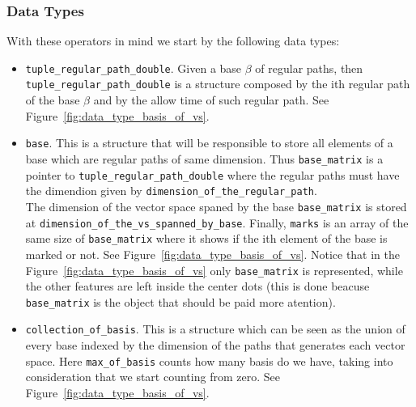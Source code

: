 \documentclass[11pt,a4paper]{article}
\begin{document}
\subsubsection{Data Types}
With these operators in mind we start by the following data types:
\begin{itemize}
	\item \texttt{tuple\_regular\_path\_double}. Given a base $\beta$ of regular paths, then
		\texttt{tuple\_regular\_path\_double} is a structure composed
		by the ith regular path of the base $\beta$ and by the 
		allow time of such regular path.
		See Figure~\ref{fig:data_type_basis_of_vs}.

	\item \texttt{base}. This is a structure that will be responsible to store all
		elements of a base which are regular paths of same
		dimension. Thus \texttt{base\_matrix} is a pointer to 
		\texttt{tuple\_regular\_path\_double} where the regular paths must 
		have the dimendion given by \texttt{dimension\_of\_the\_regular\_path}.\\
		The dimension of the vector space spaned by the base \texttt{base\_matrix}
		is stored at \texttt{dimension\_of\_the\_vs\_spanned\_by\_base}.
		Finally, \texttt{marks} is an array of
		the same size of \texttt{base\_matrix} where it shows if the ith element
		of the base is marked or not.
		See Figure~\ref{fig:data_type_basis_of_vs}. Notice that in the 
		Figure~\ref{fig:data_type_basis_of_vs}	only \texttt{base\_matrix} is
		represented, while the other features are left inside the center
		dots (this is done beacuse \texttt{base\_matrix} is the 
		object that should be paid more atention).

	\item \texttt{collection\_of\_basis}. This is a structure which can be seen as
		the union of every base indexed by the dimension of the paths
		that generates each vector space. Here \texttt{max\_of\_basis}
		counts how many basis do we have, taking into consideration that we start counting 
		from zero.
		See Figure~\ref{fig:data_type_basis_of_vs}.
\end{itemize}
\end{document}
